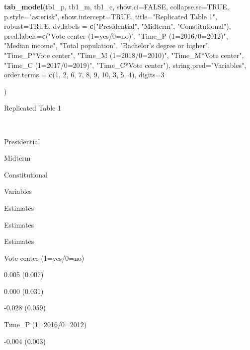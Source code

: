 \documentclass[
]{article}
\newenvironment{Shaded}{\begin{snugshade}}{\end{snugshade}}
\newcommand{\DataTypeTok}[1]{\textcolor[rgb]{0.13,0.29,0.53}{#1}}
\newcommand{\DecValTok}[1]{\textcolor[rgb]{0.00,0.00,0.81}{#1}}
\newcommand{\KeywordTok}[1]{\textcolor[rgb]{0.13,0.29,0.53}{\textbf{#1}}}
\newcommand{\NormalTok}[1]{#1}
\newcommand{\OtherTok}[1]{\textcolor[rgb]{0.56,0.35,0.01}{#1}}
\newcommand{\StringTok}[1]{\textcolor[rgb]{0.31,0.60,0.02}{#1}}
\begin{document}
\begin{Shaded}
\begin{Highlighting}[]
\KeywordTok{tab_model}\NormalTok{(tb1_p, tb1_m, tb1_c, }
          \DataTypeTok{show.ci=}\OtherTok{FALSE}\NormalTok{, }\DataTypeTok{collapse.se=}\OtherTok{TRUE}\NormalTok{, }\DataTypeTok{p.style=}\StringTok{"asterisk"}\NormalTok{, }\DataTypeTok{show.intercept=}\OtherTok{TRUE}\NormalTok{,}
          \DataTypeTok{title=}\StringTok{"Replicated Table 1"}\NormalTok{,}
          \DataTypeTok{robust=}\OtherTok{TRUE}\NormalTok{,}
          \DataTypeTok{dv.labels =} \KeywordTok{c}\NormalTok{(}\StringTok{"Presidential"}\NormalTok{, }\StringTok{"Midterm"}\NormalTok{, }\StringTok{"Constitutional"}\NormalTok{),}
          \DataTypeTok{pred.labels=}\KeywordTok{c}\NormalTok{(}\StringTok{"Vote center (1=yes/0=no)"}\NormalTok{, }\StringTok{"Time_P (1=2016/0=2012)"}\NormalTok{, }\StringTok{"Median income"}\NormalTok{, }\StringTok{"Total population"}\NormalTok{, }\StringTok{"Bachelor's degree or higher"}\NormalTok{, }\StringTok{"Time_P*Vote center"}\NormalTok{, }\StringTok{"Time_M (1=2018/0=2010)"}\NormalTok{, }\StringTok{"Time_M*Vote center"}\NormalTok{, }\StringTok{"Time_C (1=2017/0=2019)"}\NormalTok{, }\StringTok{"Time_C*Vote center"}\NormalTok{),}
          \DataTypeTok{string.pred=}\StringTok{"Variables"}\NormalTok{,}
          \DataTypeTok{order.terms =} \KeywordTok{c}\NormalTok{(}\DecValTok{1}\NormalTok{, }\DecValTok{2}\NormalTok{, }\DecValTok{6}\NormalTok{, }\DecValTok{7}\NormalTok{, }\DecValTok{8}\NormalTok{, }\DecValTok{9}\NormalTok{, }\DecValTok{10}\NormalTok{, }\DecValTok{3}\NormalTok{, }\DecValTok{5}\NormalTok{, }\DecValTok{4}\NormalTok{), }
          \DataTypeTok{digits=}\DecValTok{3}
          
\NormalTok{)}
\end{Highlighting}
\end{Shaded}

Replicated Table 1

~

Presidential

Midterm

Constitutional

Variables

Estimates

Estimates

Estimates

Vote center (1=yes/0=no)

0.005 (0.007)

0.000 (0.031)

-0.028 (0.059)

Time\_P (1=2016/0=2012)

-0.004 (0.003)
\end{document}
